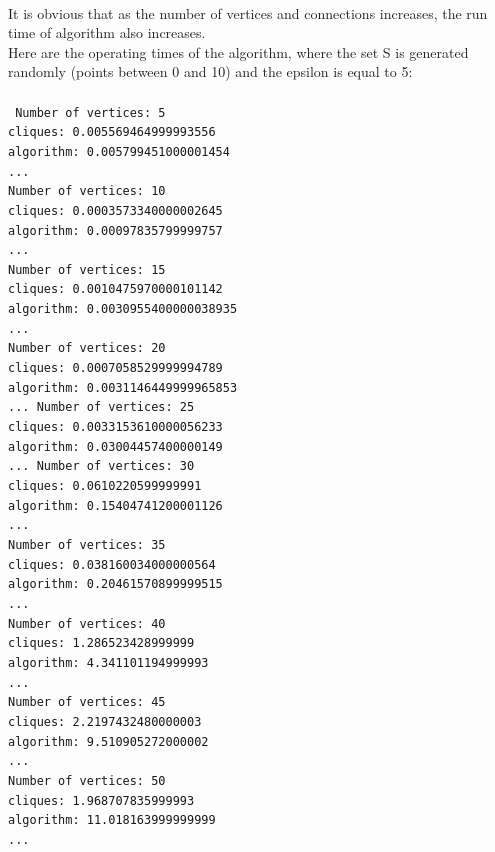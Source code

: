\documentclass[a4paper,11pt]{article}
\begin{document}
\\
It is obvious that as the number of vertices and connections increases, the run time of algorithm also increases. 
\\
Here are the operating times of the algorithm, where the set S is generated randomly (points between 0 and 10)
and the epsilon is equal to 5:
\\
\\
\texttt{
Number of vertices: 5 \\
cliques: 0.005569464999993556 \\
algorithm: 0.005799451000001454 \\
... \\
Number of vertices: 10 \\
cliques: 0.0003573340000002645 \\
algorithm: 0.00097835799999757 \\
... \\
Number of vertices: 15 \\
cliques: 0.0010475970000101142 \\
algorithm: 0.0030955400000038935 \\
... \\
Number of vertices: 20 \\
cliques: 0.0007058529999994789 \\
algorithm: 0.0031146449999965853 \\
...
Number of vertices: 25 \\
cliques: 0.0033153610000056233 \\
algorithm: 0.03004457400000149 \\
...
Number of vertices: 30 \\
cliques: 0.0610220599999991 \\
algorithm: 0.15404741200001126 \\
... \\
Number of vertices: 35 \\
cliques: 0.038160034000000564 \\
algorithm: 0.20461570899999515 \\
... \\
Number of vertices: 40 \\
cliques: 1.286523428999999 \\
algorithm: 4.341101194999993 \\
... \\
Number of vertices: 45 \\
cliques: 2.2197432480000003 \\
algorithm: 9.510905272000002 \\
... \\
Number of vertices: 50 \\
cliques: 1.968707835999993 \\
algorithm: 11.018163999999999 \\
...
}
\end{document}
